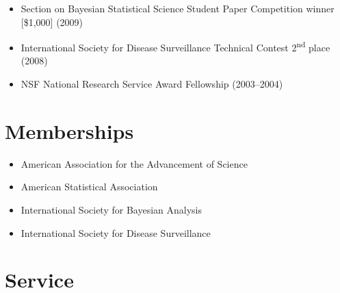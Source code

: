 \documentclass[overlapped,line]{res}
\begin{document}
\begin{resume}
\begin{itemize}
\item Section on Bayesian Statistical Science Student Paper Competition winner [\$1,000] (2009)
\item International Society for Disease Surveillance Technical Contest 2\textsuperscript{nd} place (2008)
\item NSF National Research Service Award Fellowship (2003--2004)
\end{itemize}






\section{\bf Memberships}
\begin{itemize}
\item American Association for the Advancement of Science
\item American Statistical Association
\item International Society for Bayesian Analysis
\item International Society for Disease Surveillance
\end{itemize}

\section{\bf Service}


\end{resume}
\end{document}
